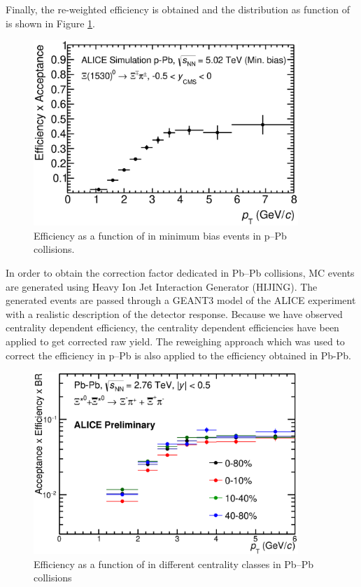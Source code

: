 Finally, the re-weighted efficiency is obtained and the distribution as function of \pt is shown in Figure \ref{fig:pPp:mbefficiency}.

\begin{figure}[htbp]
\begin{center}
\includegraphics[width=10.0cm]{./Version1/FigChapter5/MC/MBEfficiency.eps}
\caption{Efficiency as a function of \pt in minimum bias events in p--Pb collisions.} 
 \label{fig:pPp:mbefficiency}
\end{center}
\end{figure}


In order to obtain the correction factor dedicated in Pb--Pb collisions, MC events are generated using Heavy Ion Jet Interaction Generator (HIJING). The generated events are passed through a GEANT3 model of the ALICE experiment with a realistic description of the detector response. Because we have observed centrality dependent efficiency, the centrality dependent efficiencies have been applied to get corrected raw yield. The reweighing approach which was used to correct the efficiency in p--Pb is also applied to the efficiency obtained in Pb-Pb. 

\begin{figure}[htbp]
\begin{center}
\includegraphics[width=10.0cm]{./Version1/FigChapter5/MC/PbPbEfficiency.eps}
\caption{Efficiency as a function of \pt in different centrality classes in Pb--Pb collisions} 
 \label{fig:PbPb:efficiency}
\end{center}
\end{figure}


